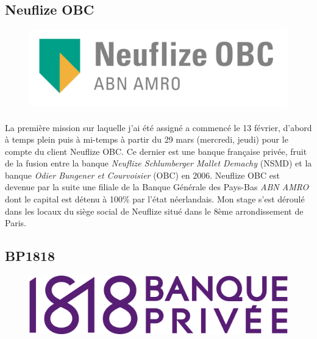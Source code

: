 \subsection{Neuflize OBC}

\begin{figure}[h]
	\includegraphics[scale=0.3]{images/neuflizeOBCLogo.png}
	\centering
	\label{neuflizeOBCLogo}
\end{figure}

\paragraph{}
La première mission sur laquelle j'ai été assigné a commencé le 13 février, d'abord à temps plein puis à mi-temps à partir du 29 mars (mercredi, jeudi) pour le compte du client Neuflize OBC. Ce dernier est une banque française privée, fruit de la fusion entre la banque \textit{Neuflize Schlumberger Mallet Demachy} (NSMD) et la banque \textit{Odier Bungener et Courvoisier} (OBC) en 2006. Neuflize OBC est devenue par la suite une filiale de la Banque Générale des Pays-Bas \textit{ABN AMRO} dont le capital est détenu à 100\% par l'état néerlandais. Mon stage s'est déroulé dans les locaux du siège social de Neuflize situé dans le 8ème arrondissement de Paris.

\subsection{BP1818}

\begin{figure}[h]
	\includegraphics[scale=0.3]{images/bp1818Logo.png}
	\centering
	\label{bp1818Logo}
\end{figure}


